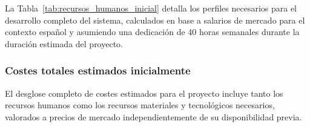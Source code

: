 \begin{table}[htbp!]
  \centering
  \caption{Estimación de costes de recursos humanos basada en datos salariales del sector tecnológico español~\cite{tecnoempleo_empleo_it_2025,4geeks_salario_programador_espana_2025,adalab_salarios_programador_2024}}
  \label{tab:recursos_humanos_inicial}
\end{table}

La Tabla~\ref{tab:recursos_humanos_inicial} detalla los perfiles necesarios para el desarrollo completo del sistema, calculados en base a salarios de mercado para el contexto español y asumiendo una dedicación de 40 horas semanales durante la duración estimada del proyecto.

\subsubsection{Costes totales estimados inicialmente}
\label{subsubsec:costes_totales_estimados}

El desglose completo de costes estimados para el proyecto incluye tanto los recursos humanos como los recursos materiales y tecnológicos necesarios, valorados a precios de mercado independientemente de su disponibilidad previa.

